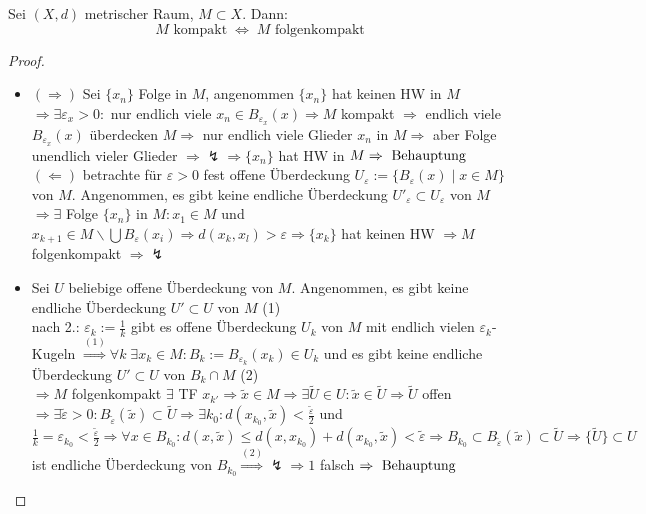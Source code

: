 \begin{theorem}
	Sei $(X,d)$ metrischer Raum, $M\subset X$. Dann:\[M\text{ kompakt} \;\Leftrightarrow\; M\text{ folgenkompakt}\]
\end{theorem}
\begin{proof}
	\begin{itemize}
		\item $(\Rightarrow)$ Sei $\{x_n\}$ Folge in $M$, angenommen $\{x_n\}$ hat keinen HW in $M$ \\
		$\Rightarrow\exists\varepsilon_x>0:$ nur endlich viele $x_n\in B_{\varepsilon_x}(x)\Rightarrow M$ kompakt $\Rightarrow$ endlich viele $B_{\varepsilon_x}(x)$ überdecken $M\Rightarrow$ nur endlich viele Glieder $x_n$ in $M\Rightarrow$ aber Folge unendlich vieler Glieder $\Rightarrow\lightning\Rightarrow \{x_n\}$ hat HW in $M\Rightarrow \text{ Behauptung}$\\
		$(\Leftarrow)$ betrachte für $\varepsilon>0$ fest offene Überdeckung $U_{\varepsilon}:=\{B_{\varepsilon}(x)\mid x\in M\}$ von $M$. Angenommen, es gibt keine endliche Überdeckung $U'_{\varepsilon}\subset U_{\varepsilon}$ von $M$ \\
		$\Rightarrow\exists$ Folge $\{x_n\}$ in $M:x_1\in M$ und $x_{k+1}\in M\backslash\bigcup B_{\varepsilon}(x_i)\Rightarrow d(x_k,x_l)>\varepsilon\Rightarrow \{x_k\}$ hat keinen HW $\Rightarrow M$ folgenkompakt $\Rightarrow\lightning$
		\item Sei $U$ beliebige offene Überdeckung von $M$. Angenommen, es gibt keine endliche Überdeckung $U'\subset U$ von $M$ (1) \\
		nach 2.: $\varepsilon_k:=\frac{1}{k}$ gibt es offene Überdeckung $U_k$ von $M$ mit endlich vielen $\varepsilon_k$-Kugeln $\overset{(1)}{\Rightarrow}\forall k\;\exists x_k\in M:B_k:=B_{\varepsilon_k}(x_k)\in U_k$ und es gibt keine endliche Überdeckung $U'\subset U$ von $B_k\cap M$ (2) \\
		$\Rightarrow M$ folgenkompakt $\exists$ TF $x_{k'}\Rightarrow \tilde{x}\in M\Rightarrow\exists\tilde U\in U:\tilde{x}\in\tilde{U}\Rightarrow\tilde{U}$ offen $\Rightarrow\exists\tilde{\varepsilon}>0:B_{\tilde{\varepsilon}}(\tilde{x})\subset\tilde{U}\Rightarrow\exists k_0:d(x_{k_0},\tilde{x})<\frac{\tilde{\varepsilon}}{2}$ und $\frac{1}{k}=\varepsilon_{k_0}<\frac{\tilde{\varepsilon}}{2}\Rightarrow\forall x\in B_{k_0}: d(x,\tilde{x})\le d(x,x_{k_0})+d(x_{k_0},\tilde{x})<\tilde{\varepsilon}\Rightarrow B_{k_0}\subset B_{\tilde{\varepsilon}}(\tilde{x})\subset \tilde{U}\Rightarrow \{\tilde{U}\}\subset U$ ist endliche Überdeckung von $B_{k_0}\overset{(2)}{\Rightarrow}\lightning\Rightarrow 1$ falsch $\Rightarrow \text{ Behauptung}$
	\end{itemize}
\end{proof}

